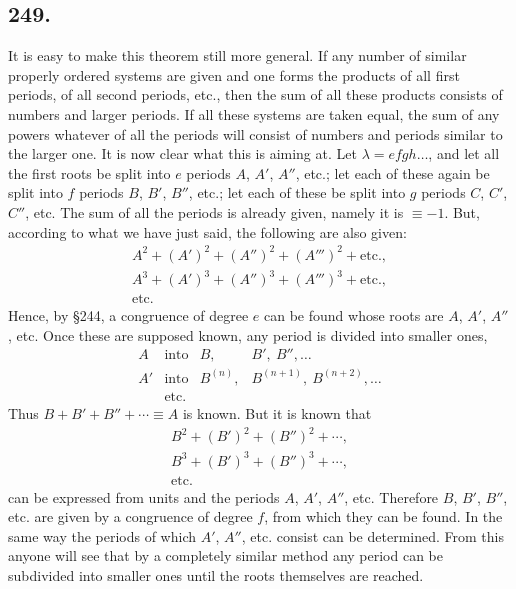 \documentclass[12pt]{article}
\begin{document}
\subsection*{249.}
It is easy to make this theorem still more general. If any number of similar properly ordered systems are given and one forms the products of all first periods, of all second periods, etc., then the sum of all these products consists of numbers and larger periods. If all these systems are taken equal, the sum of any powers whatever of all the periods will consist of numbers and periods similar to the larger one. It is now clear what this is aiming at. Let $\lambda=efgh\ldots$, and let all the first roots be split into $e$ periods $A$, $A'$, $A''$, etc.; let each of these again be split into $f$ periods $B$, $B'$, $B''$, etc.; let each of these be split into $g$ periods $C$, $C'$, $C''$, etc. The sum of all the periods is already given, namely it is $\equiv -1$. But, according to what we have just said, the following are also given:
\[
\begin{gathered}
A^2+(A')^2+(A'')^2+(A''')^2+\text{etc.},\\
A^3+(A')^3+(A'')^3+(A''')^3+\text{etc.},\\
\text{etc.}
\end{gathered}
\]
Hence, by §244, a congruence of degree $e$ can be found whose roots are $A$, $A'$, $A''$, etc. Once these are supposed known, any period is divided into smaller ones,
\[
\begin{array}{llll}
A&\text{into}& B,&B',\ B'',\ldots\\
A'&\text{into}& B^{(n)},&B^{(n+1)},\ B^{(n+2)},\ldots\\
&\text{etc.}
\end{array}
\]
Thus $B+B'+B''+\cdots\equiv A$ is known. But it is known that
\[
\begin{gathered}
B^2+(B')^2+(B'')^2+\cdots,\\
B^3+(B')^3+(B'')^3+\cdots,\\
\text{etc.}
\end{gathered}
\]
can be expressed from units and the periods $A$, $A'$, $A''$, etc. Therefore $B$, $B'$, $B''$, etc. are given by a congruence of degree $f$, from which they can be found. In the same way the periods of which $A'$, $A''$, etc. consist can be determined. From this anyone will see that by a completely similar method any period can be subdivided into smaller ones until the roots themselves are reached.
\end{document}
